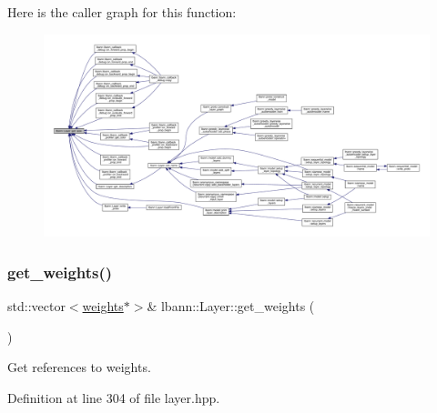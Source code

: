 Here is the caller graph for this function\+:\nopagebreak
\begin{figure}[H]
\begin{center}
\leavevmode
\includegraphics[width=350pt]{classlbann_1_1Layer_a0fa0ea9160b490c151c0a17fde4f7239_icgraph}
\end{center}
\end{figure}
\mbox{\label{classlbann_1_1Layer_a4ee78d42284421519dd18d27b4da0957}} 
\subsubsection{\texorpdfstring{get\+\_\+weights()}{get\_weights()}\hspace{0.1cm}{\footnotesize\ttfamily [1/2]}}
{\footnotesize\ttfamily std\+::vector$<$\hyperlink{classlbann_1_1weights}{weights}$\ast$$>$\& lbann\+::\+Layer\+::get\+\_\+weights (\begin{DoxyParamCaption}{ }\end{DoxyParamCaption})\hspace{0.3cm}{\ttfamily [inline]}}

Get references to weights. 

Definition at line 304 of file layer.\+hpp.


